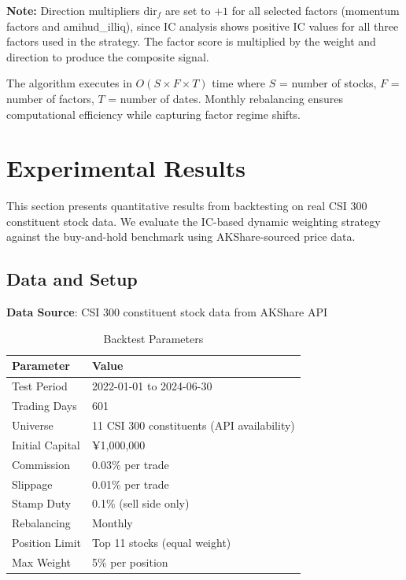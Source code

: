 \documentclass[12pt]{article}
\begin{document}
\noindent \textbf{Note:} Direction multipliers $\text{dir}_f$ are set to $+1$ for all selected factors (momentum factors and amihud\_illiq), since IC analysis shows positive IC values for all three factors used in the strategy. The factor score is multiplied by the weight and direction to produce the composite signal.

The algorithm executes in $O(S \times F \times T)$ time where $S$ = number of stocks, $F$ = number of factors, $T$ = number of dates. Monthly rebalancing ensures computational efficiency while capturing factor regime shifts.

\section{Experimental Results}

This section presents quantitative results from backtesting on real CSI 300 constituent stock data. We evaluate the IC-based dynamic weighting strategy against the buy-and-hold benchmark using AKShare-sourced price data.

\subsection{Data and Setup}

\textbf{Data Source}: CSI 300 constituent stock data from AKShare API

\begin{table}[h]
\centering
\caption{Backtest Parameters}
\begin{tabular}{ll}
\toprule
\textbf{Parameter} & \textbf{Value} \\
\midrule
Test Period & 2022-01-01 to 2024-06-30 \\
Trading Days & 601 \\
Universe & 11 CSI 300 constituents (API availability) \\
Initial Capital & ¥1,000,000 \\
Commission & 0.03\% per trade \\
Slippage & 0.01\% per trade \\
Stamp Duty & 0.1\% (sell side only) \\
Rebalancing & Monthly \\
Position Limit & Top 11 stocks (equal weight) \\
Max Weight & 5\% per position \\
\bottomrule
\end{tabular}
\end{table}
\end{document}
